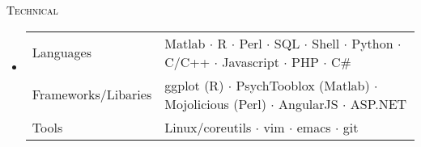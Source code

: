 \begin{minipage}{\firstWidth}
\large \textcolor{Black}{\textsc{Technical}}
\end{minipage}
\begin{minipage}{\secondWidth}
\begin{itemize}
    \item 
    \begin{tabular}{ll}
    Languages &  Matlab $\cdot$ R $\cdot$ Perl $\cdot$ SQL $\cdot$ Shell $\cdot$ Python $\cdot$ C/C++ $\cdot$ Javascript $\cdot$ PHP $\cdot$ C\# \\
    Frameworks/Libaries & ggplot (R) $\cdot$ PsychTooblox (Matlab) $\cdot$ Mojolicious (Perl) $\cdot$ AngularJS $\cdot$ ASP.NET \\
    Tools&   Linux/coreutils $\cdot$ vim $\cdot$ emacs $\cdot$ git \\
    \end{tabular}
\end{itemize}
\end{minipage}
